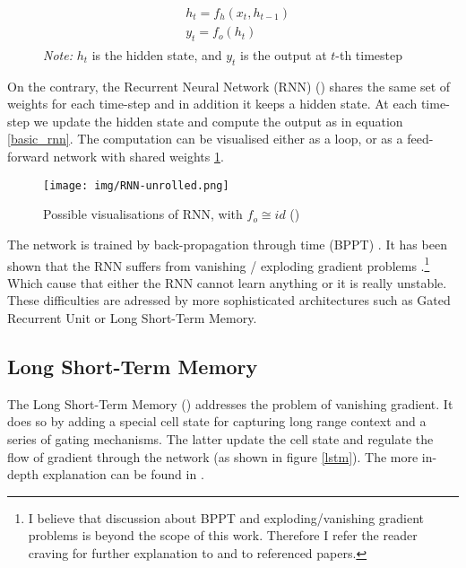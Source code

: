 \begin{figure}[!h]
\begin{align} \label{basic_rnn}
\begin{split}
    &h_t = f_h(x_t, h_{t-1}) \\
    &y_t = f_o(h_t)
\end{split}
\end{align}
\centering
\footnotesize{\textit{Note:} $h_t$ is the hidden state, and $y_t$ is the output at $t$-th timestep}
\end{figure}
On the contrary, the Recurrent Neural Network (RNN) (\citep{rumelhart_rnn1988}) shares the same set of weights for each time-step and in addition it keeps a hidden state. At each time-step we update the hidden state and compute the output as in equation \ref{basic_rnn}. The computation can be visualised either as a loop, or as a feed-forward network with shared weights \ref{vis_rnn}.


\begin{figure}[!h]
    \texttt{[image: img/RNN-unrolled.png]}
    \caption{Possible visualisations of RNN, with $f_o \cong id$ (\citep{Olah2015})} \label{vis_rnn}
\end{figure}

The network is trained by back-propagation through time (BPPT) \citep{bpptWerbos1990}. It has been shown that the RNN suffers from vanishing / exploding gradient problems \citep{hochreiter1997}.\footnote{I believe that discussion about BPPT and exploding/vanishing gradient problems is beyond the scope of this work. Therefore I refer the reader craving for further explanation to \citep{Goodfellow-et-al-2016} and to referenced papers.} Which cause that either the RNN cannot learn anything or it is really unstable. These difficulties are adressed by more sophisticated architectures such as Gated Recurrent Unit or Long Short-Term Memory.


\subsection{Long Short-Term Memory}

The Long Short-Term Memory (\citep{hochreiter1997}) addresses the problem of vanishing gradient. It does so by adding a special cell state for capturing long range context and a series of gating mechanisms. The latter update the cell state and regulate the flow of gradient through the network (as shown in figure \ref{lstm}). The more in-depth explanation can be found in \citep{Olah2015}.

